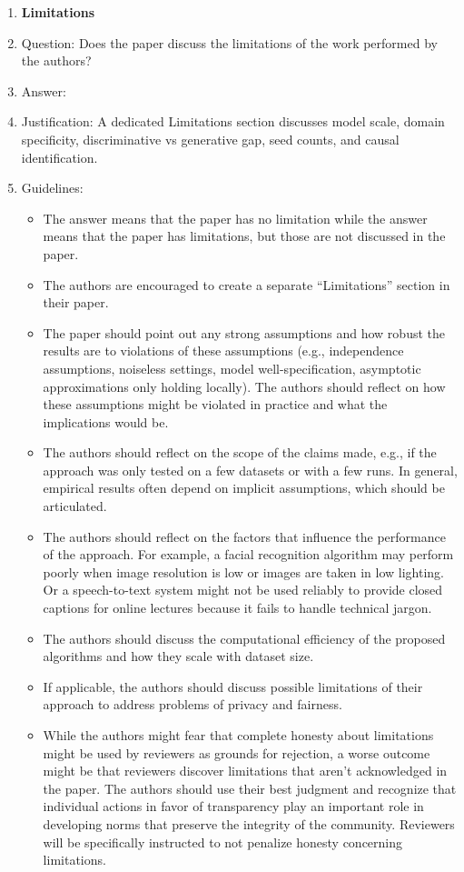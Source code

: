 \documentclass{article}
\begin{document}
\begin{enumerate}
\item {\bf Limitations}
    \item[] Question: Does the paper discuss the limitations of the work performed by the authors?
    \item[] Answer: \answerYes{}
    \item[] Justification: A dedicated Limitations section discusses model scale, domain specificity, discriminative vs generative gap, seed counts, and causal identification.
    \item[] Guidelines:
    \begin{itemize}
        \item The answer \answerNA{} means that the paper has no limitation while the answer \answerNo{} means that the paper has limitations, but those are not discussed in the paper.
        \item The authors are encouraged to create a separate ``Limitations'' section in their paper.
        \item The paper should point out any strong assumptions and how robust the results are to violations of these assumptions (e.g., independence assumptions, noiseless settings, model well-specification, asymptotic approximations only holding locally). The authors should reflect on how these assumptions might be violated in practice and what the implications would be.
        \item The authors should reflect on the scope of the claims made, e.g., if the approach was only tested on a few datasets or with a few runs. In general, empirical results often depend on implicit assumptions, which should be articulated.
        \item The authors should reflect on the factors that influence the performance of the approach. For example, a facial recognition algorithm may perform poorly when image resolution is low or images are taken in low lighting. Or a speech-to-text system might not be used reliably to provide closed captions for online lectures because it fails to handle technical jargon.
        \item The authors should discuss the computational efficiency of the proposed algorithms and how they scale with dataset size.
        \item If applicable, the authors should discuss possible limitations of their approach to address problems of privacy and fairness.
        \item While the authors might fear that complete honesty about limitations might be used by reviewers as grounds for rejection, a worse outcome might be that reviewers discover limitations that aren't acknowledged in the paper. The authors should use their best judgment and recognize that individual actions in favor of transparency play an important role in developing norms that preserve the integrity of the community. Reviewers will be specifically instructed to not penalize honesty concerning limitations.
    \end{itemize}


\end{enumerate}
\end{document}
